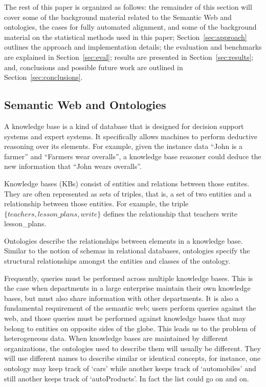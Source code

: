 \documentclass[letterpaper,twocolumn,12pt]{article}
\begin{document}
\noindent The rest of this paper is organized as follows: the remainder of this section will cover some of the background material related to the Semantic Web and ontologies, the cases for fully automated alignment, and some of the background material on the statistical methods used in this paper; Section~\ref{sec:approach} outlines the approach and implementation details; the evaluation and benchmarks are explained in Section~\ref{sec:eval}; results are presented in Section~\ref{sec:results}; and, conclusions and possible future work are outlined in Section~\ref{sec:conclusions}.

\subsection{Semantic Web and Ontologies}
\label{subsec:semanticweb}

A knowledge base is a kind of database that is designed 
for decision support systems and expert systems. It specifically allows
machines to perform deductive reasoning over its elements.
For example, given the instance data ``John is a farmer'' and ``Farmers
wear overalls'', a knowledge base reasoner could deduce the new information
that ``John wears overalls''.

Knowledge bases (KBs) consist of entities and
relations between those entites. They are often represented as sets of
triples, that is, a set of two entities and a relationship between those
entities. For example, the triple ${\{teachers, lesson\_plans, write\}}$
defines the relationship that teachers write lesson\_plans.

Ontologies describe the relationships between elements in a knowledge base.
Similar to the notion of schemas in relational databases, ontologies specify
the structural relationships amongst the entities and classes of the ontology.

Frequently, queries must be performed across multiple knowledge bases. This is the
case when departments in a large enterprise maintain their own knowledge bases,
but must also share information with other departments. It is also a fundamental
requirement of the semantic web; users perform queries against the web,
and those queries must be performed against knowledge bases that may belong to 
entities on opposite sides of the globe. This leads us to the problem of heterogeneous
data. When knowledge bases are maintained by different organizations, the ontologies
used to describe them will usually be different. They will use different names
to describe similar or identical concepts, for instance, one ontology may keep track
of `cars' while another keeps track of `automobiles' and still another keeps track of 
`autoProducts'. In fact the list could go on and on.
\end{document}
